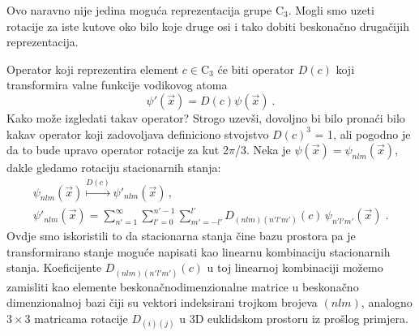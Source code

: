 Ovo naravno nije jedina moguća reprezentacija grupe $\mathrm{C}_3$.
Mogli smo uzeti rotacije za iste kutove oko bilo koje druge osi i
tako dobiti beskonačno drugačijih reprezentacija.

\begin{primjer}
    \label{ex:C3} 
Operator koji reprezentira element $c\in\mathrm{C}_3$ će biti
operator $D(c)$ koji transformira valne funkcije vodikovog atoma
\begin{equation}
\psi'(\vec{x})=D(c)\psi(\vec{x}) \:.
\end{equation}
Kako može izgledati takav operator? Strogo uzevši, dovoljno bi bilo pronaći
bilo kakav
operator koji zadovoljava definiciono stvojstvo $D(c)^3$ = 1, ali
pogodno je da to bude upravo operator rotacije za kut 2$\pi$/3.
Neka je $\psi(\vec{x})=\psi_{nlm}(\vec{x})$, dakle gledamo rotaciju
stacionarnih stanja:
\begin{gather}
\psi_{nlm}(\vec{x}) \stackrel{D(c)}{\mapsto}  \psi'_{nlm}(\vec{x}) \,, \\
   \psi'_{nlm}(\vec{x}) = \sum_{n'=1}^{\infty}\sum_{l'=0}^{n'-1}
  \sum_{m'=-l'}^{l'}  D_{(nlm)(n'l'm')}(c)\,  \psi_{n'l'm'}(\vec{x}) \;. 
  \label{eq:nlmexp}
\end{gather}
Ovdje smo iskoristili to da stacionarna stanja čine bazu prostora pa je
transformirano stanje moguće napisati kao linearnu kombinaciju stacionarnih
stanja. Koeficijente $D_{(nlm)(n'l'm')}(c)$ u toj linearnoj kombinaciji
možemo zamisliti kao elemente beskonačnodimenzionalne matrice u beskonačno
dimenzionalnoj bazi čiji su vektori indeksirani trojkom brojeva $(nlm)$, analogno
$3\times 3$ matricama rotacije $D_{(i)(j)}$ u 3D euklidskom prostoru iz prošlog
primjera.


\end{primjer}
